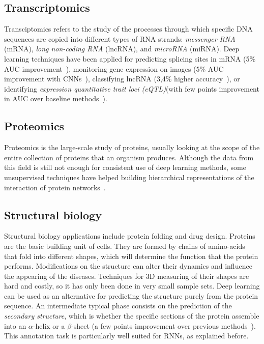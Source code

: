 \documentclass[journal]{IEEEtran}
\begin{document}
\subsection{Transcriptomics}
Transciptomics refers to the study of the processes through which specific DNA sequences are copied into different types of RNA strands: \textit{messenger RNA} (mRNA), \textit{long non-coding RNA} (lncRNA), and \textit{microRNA} (miRNA). Deep learning techniques have been applied for predicting splicing sites in mRNA (5\% AUC improvement~\cite{Leung2014}), monitoring gene expression on images (5\% AUC improvement with CNNs~\cite{Zeng2015}), classifying lncRNA (3,4\% higher accuracy~\cite{Fan2015}), or identifying \textit{expression quantitative trait loci (eQTL)}(with few points improvement in AUC over baseline methods~\cite{Witteveen2014}).

\subsection{Proteomics}
Proteomics is the large-scale study of proteins, usually looking at the scope of the entire collection of proteins that an organism produces. Although the data from this field is still not enough for consistent use of deep learning methods, some unsupervised techniques have helped building hierarchical representations of the interaction of protein networks~\cite{Chen2015}.

\subsection{Structural biology}
Structural biology applications include protein folding and drug design. Proteins are the basic building unit of cells. They are formed by chains of amino-acids that fold into different shapes, which will determine the function that the protein performs. Modifications on the structure can alter their dynamics and influence the appearing of the diseases. Techniques for 3D measuring of their shapes are hard and costly, so it has only been done in very small sample sets. Deep learning can be used as an alternative for predicting the structure purely from the protein sequence. An intermediate typical phase consists on the prediction of the \textit{secondary structure}, which is whether the specific sections of the protein assemble into an $\alpha$-helix or a $\beta$-sheet (a few points improvement  over previous methods~\cite{Jurtz2017}). This annotation task is particularly well suited for RNNs, as explained before.
\end{document}
